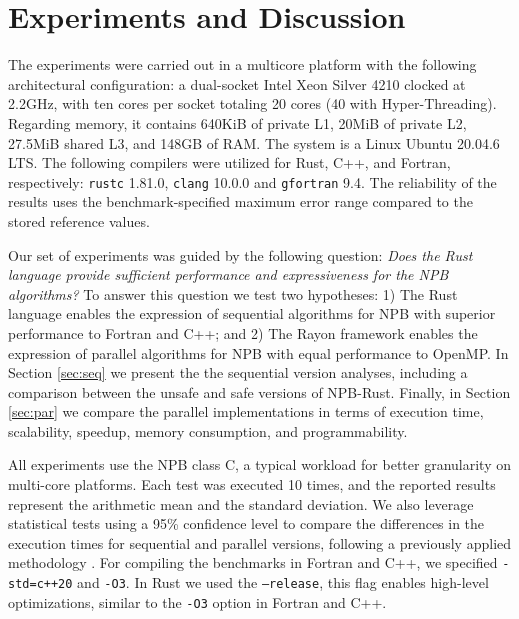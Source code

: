 


\section{Experiments and Discussion}\label{sec:expdisc}
The experiments were carried out in a multicore platform with the following architectural configuration: a dual-socket Intel Xeon Silver 4210 clocked at 2.2GHz, with ten cores per socket totaling 20 cores (40 with Hyper-Threading). Regarding memory, it contains 640KiB of private L1, 20MiB of private L2, 27.5MiB shared L3, and 148GB of RAM. The system is a Linux Ubuntu 20.04.6 LTS. The following compilers were utilized for Rust, C++, and Fortran, respectively: \texttt{rustc} 1.81.0, \texttt{clang} 10.0.0 and \texttt{gfortran} 9.4. The reliability of the results uses the benchmark-specified maximum error range compared to the stored reference values. %

Our set of experiments was guided by the following question: \textit{Does the Rust language provide sufficient performance and expressiveness for the NPB algorithms?} To answer this question we test two hypotheses: 1) The Rust language enables the expression of sequential algorithms for NPB with superior performance to Fortran and C++; and 2) The Rayon framework enables the expression of parallel algorithms for NPB with equal performance to OpenMP. In Section \ref{sec:seq} we present the the sequential version analyses, including a comparison between the unsafe and safe versions of NPB-Rust. Finally, in Section \ref{sec:par} we compare the parallel implementations in terms of execution time, scalability, speedup, memory consumption, and programmability. 

All experiments use the NPB class C, a typical workload for better granularity on multi-core platforms. Each test was executed 10 times, and the reported results represent the arithmetic mean and the standard deviation. We also leverage statistical tests using a 95\% confidence level to compare the differences in the execution times for sequential and parallel versions, following a previously applied methodology \cite{NPB-CPP-2021}. For compiling the benchmarks in Fortran and C++, we specified \texttt{-std=c++20} and \texttt{-O3}. In Rust we used the \texttt{--release}, this flag enables high-level optimizations, similar to the \texttt{-O3} option in Fortran and C++.

